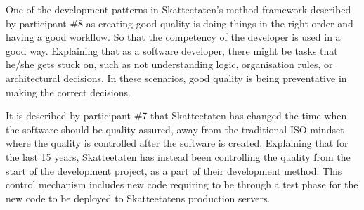 One of the development patterns in Skatteetaten's method-framework described by participant \#8 as creating good quality is doing things in the right order and having a good workflow. So that the competency of the developer is used in a good way. Explaining that as a software developer, there might be tasks that he/she gets stuck on, such as not understanding logic, organisation rules, or architectural decisions. In these scenarios, good quality is being preventative in making the correct decisions.


It is described by participant \#7 that Skatteetaten has changed the time when the software should be quality assured, away from the traditional ISO mindset where the quality is controlled after the software is created. Explaining that for the last 15 years, Skatteetaten has instead been controlling the quality from the start of the development project, as a part of their development method. This control mechanism includes new code requiring to be through a test phase for the new code to be deployed to Skatteetatens production servers.




